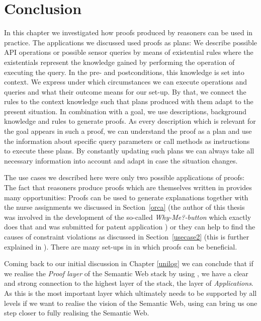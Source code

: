 \section{Conclusion}
\label{sec:Conclusion}
In this chapter we investigated how proofs produced by \nthree reasoners can be used in practice. 
The applications we discussed used proofs as plans: We describe possible API operations or possible sensor queries by means of existential rules where
the existentials 
represent the knowledge gained by performing the operation of executing the query. In the pre- and postconditions, this knowledge is set into context. We express 
under which circumstances we can execute operations and queries and what their outcome means for our set-up. By that, we connect the rules to the context knowledge 
such that plans produced with them adapt to the present situation. In combination with a goal, we use descriptions, background knowledge and rules to generate 
proofs. 
As every description which is relevant for the goal appears in such a proof, we can understand the proof as a plan and use the information about specific 
query parameters or 
call methods as instructions to execute these plans. By constantly updating such plans we can always take all necessary information into account and adapt in case 
the situation changes.

The use cases we described here were only two possible applications of \nthree proofs: The fact that \nthree reasoners produce proofs which are themselves written in \nthree 
provides many opportunities: Proofs can be used to generate explanations together with the nurse assignments we discussed in Section~\ref{orca} 
(the author of this thesis was involved in the development of the so-called \emph{Why-Me?-button} which exactly does that and was submitted for patent application 
\cite{patent_15202196-0-1955}) or they can help to find the causes of constraint violations as discussed in Section~\ref{usecase2} (this is further explained in \cite{ben}).
There are many set-ups in in which \nthree proofs can be beneficial.

Coming back to our initial discussion in Chapter \ref{unilog} we can conclude that if we realise the \emph{Proof layer} of the Semantic Web stack by using \nthree,
we have a clear and strong connection to the highest layer of the stack, the layer of \emph{Applications}. 
As this is the most important layer which ultimately needs to be supported 
by all levels if we want to realise the vision of the Semantic Web, using \nthreelogic can bring us one step closer to fully realising the Semantic Web.